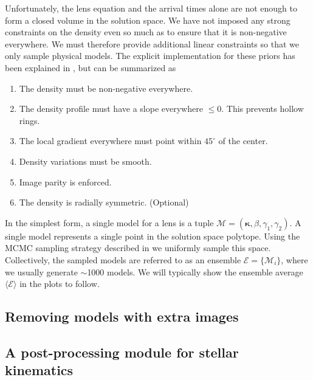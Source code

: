 \documentclass[galley]{mn2e}
\newcommand{\M}{\ensuremath{\mathscr{M}}}
\newcommand{\E}{\ensuremath{\mathscr{E}}}
\newcommand{\Eavg}{\ensuremath{\langle \E \rangle}}
\renewcommand{\vec}[1]{\ensuremath{\boldsymbol{#1}}}
\begin{document}
Unfortunately, the lens equation and the arrival times alone are not enough to form a
closed volume in the solution space. We have not imposed any strong constraints
on the density even so much as to ensure that it is non-negative everywhere. We
must therefore provide additional linear constraints so that we only sample
physical models. The explicit implementation for these priors has been
explained in \cite{}, but can be summarized as
\begin{enumerate}
\item The density must be non-negative everywhere.
\item The density profile must have a slope everywhere $\le 0$. This prevents hollow rings.
\item The local gradient everywhere must point within $45^{\circ}$ of the center.
\item Density variations must be smooth.
\item Image parity is enforced.
\item The density is radially symmetric. (Optional)
\end{enumerate}

In the simplest form, a single model for a lens is a tuple $\M = (\vec\kappa,
\beta, \gamma_1, \gamma_2)$. A single model represents a single point in the
solution space polytope. Using the MCMC sampling strategy described in \cite{}
we uniformly sample this space. Collectively, the sampled models are referred
to as an ensemble $\E = \{\M_i\}$, where we usually generate $\sim$1000 models. We
will typically show the ensemble average $\Eavg$ in the plots to
follow.

\subsection{Removing models with extra images}



\subsection{A post-processing module for stellar kinematics}


\end{document}
